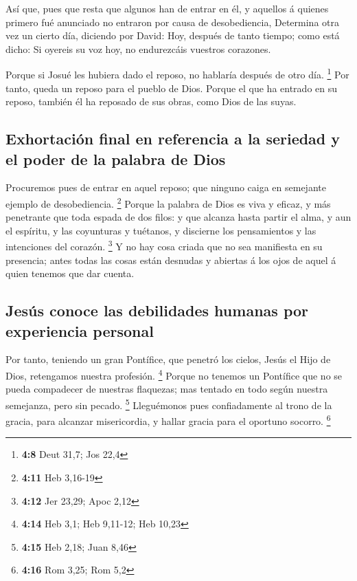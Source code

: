  Así que, pues que resta que algunos han de entrar en él, y
aquellos á quienes primero fué anunciado no entraron por causa de
desobediencia,  Determina otra vez un cierto día, diciendo
por David: Hoy, después de tanto tiempo; como está dicho: Si oyereis su
voz hoy, no endurezcáis vuestros corazones.

 Porque si Josué les hubiera dado el reposo, no hablaría
después de otro día. \footnote{\textbf{4:8} Deut 31,7; Jos 22,4}
 Por tanto, queda un reposo para el pueblo de Dios.
 Porque el que ha entrado en su reposo, también él ha
reposado de sus obras, como Dios de las suyas.

\hypertarget{exhortaciuxf3n-final-en-referencia-a-la-seriedad-y-el-poder-de-la-palabra-de-dios}{%
\subsection{Exhortación final en referencia a la seriedad y el poder de
la palabra de
Dios}\label{exhortaciuxf3n-final-en-referencia-a-la-seriedad-y-el-poder-de-la-palabra-de-dios}}

 Procuremos pues de entrar en aquel reposo; que ninguno
caiga en semejante ejemplo de desobediencia. \footnote{\textbf{4:11} Heb
  3,16-19}  Porque la palabra de Dios es viva y eficaz, y
más penetrante que toda espada de dos filos: y que alcanza hasta partir
el alma, y aun el espíritu, y las coyunturas y tuétanos, y discierne los
pensamientos y las intenciones del corazón. \footnote{\textbf{4:12} Jer
  23,29; Apoc 2,12}  Y no hay cosa criada que no sea
manifiesta en su presencia; antes todas las cosas están desnudas y
abiertas á los ojos de aquel á quien tenemos que dar cuenta.

\hypertarget{jesuxfas-conoce-las-debilidades-humanas-por-experiencia-personal}{%
\subsection{Jesús conoce las debilidades humanas por experiencia
personal}\label{jesuxfas-conoce-las-debilidades-humanas-por-experiencia-personal}}

 Por tanto, teniendo un gran Pontífice, que penetró los
cielos, Jesús el Hijo de Dios, retengamos nuestra profesión. \footnote{\textbf{4:14}
  Heb 3,1; Heb 9,11-12; Heb 10,23}  Porque no tenemos un
Pontífice que no se pueda compadecer de nuestras flaquezas; mas tentado
en todo según nuestra semejanza, pero sin pecado. \footnote{\textbf{4:15}
  Heb 2,18; Juan 8,46}  Lleguémonos pues confiadamente al
trono de la gracia, para alcanzar misericordia, y hallar gracia para el
oportuno socorro. \footnote{\textbf{4:16} Rom 3,25; Rom 5,2}

